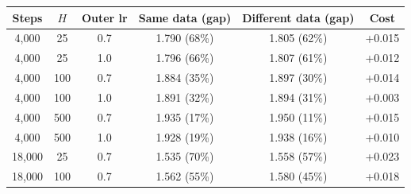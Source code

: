 \begin{tabular}{cccccc}
\toprule
Steps & $H$ & Outer lr & Same data (gap) & Different data (gap) & Cost \\
\midrule
4{,}000 & 25 & 0.7 & 1.790 (68\%) & 1.805 (62\%) & +0.015 \\
4{,}000 & 25 & 1.0 & 1.796 (66\%) & 1.807 (61\%) & +0.012 \\
4{,}000 & 100 & 0.7 & 1.884 (35\%) & 1.897 (30\%) & +0.014 \\
4{,}000 & 100 & 1.0 & 1.891 (32\%) & 1.894 (31\%) & +0.003 \\
4{,}000 & 500 & 0.7 & 1.935 (17\%) & 1.950 (11\%) & +0.015 \\
4{,}000 & 500 & 1.0 & 1.928 (19\%) & 1.938 (16\%) & +0.010 \\
\midrule
18{,}000 & 25 & 0.7 & 1.535 (70\%) & 1.558 (57\%) & +0.023 \\
18{,}000 & 100 & 0.7 & 1.562 (55\%) & 1.580 (45\%) & +0.018 \\
\bottomrule
\end{tabular}
